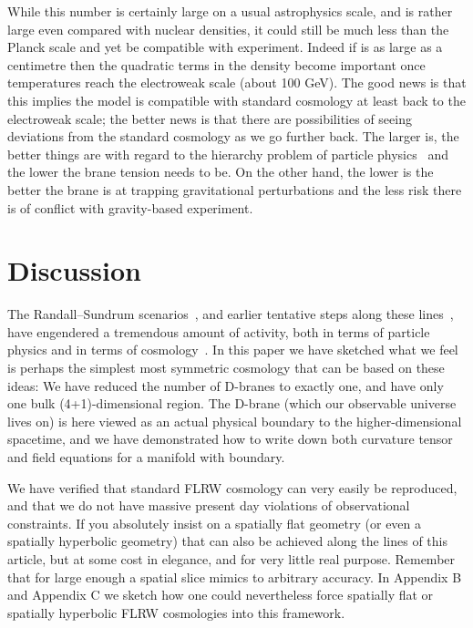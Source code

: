 \documentclass[a4paper,12pt]{article}
\begin{document}
%
While this number is certainly large on a usual astrophysics scale,
and is rather large even compared with nuclear densities, it could
still be much less than the Planck scale and yet be compatible with
experiment. Indeed if \coordHE{} is as large as a centimetre then
the quadratic terms in the density become important once temperatures
reach the electroweak scale (about 100 GeV).  The good news is that
this implies the model is compatible with standard cosmology at least
back to the electroweak scale; the better news is that there are
possibilities of seeing deviations from the standard cosmology as we
go further back. The larger \coordHE{} is, the better things are
with regard to the hierarchy problem of particle physics~\cite{RS1,RS2}
and the lower the brane tension needs to be. On the other hand, the
lower \coordHE{} is the better the brane is at trapping
gravitational perturbations and the less risk there is of conflict
with gravity-based experiment.

\section{Discussion}
\label{S:discusion}

The Randall--Sundrum scenarios~\cite{RS1,RS2}, and earlier tentative
steps along these lines~\cite{Gogberashvili1}, have engendered a
tremendous amount of activity, both in terms of particle physics and
in terms of cosmology~\cite{Gogberashvili2,RS-cosmology}. In this
paper we have sketched what we feel is perhaps the simplest most
symmetric cosmology that can be based on these ideas: We have reduced
the number of D-branes to exactly one, and have only one bulk
(4+1)-dimensional region. The D-brane (which our observable universe
lives on) is here viewed as an actual physical boundary to the
higher-dimensional spacetime, and we have demonstrated how to write
down both curvature tensor and field equations for a manifold with
boundary.

We have verified that standard \coordHE{} FLRW cosmology can very easily
be reproduced, and that we do not have massive present day violations
of observational constraints.  If you absolutely insist on a spatially
flat \coordHE{} geometry (or even a spatially hyperbolic \coordHE{} geometry)
that can also be achieved along the lines of this article, but at some
cost in elegance, and for very little real purpose. Remember that for
\coordHE{} large enough a \coordHE{} spatial slice mimics \coordHE{} to
arbitrary accuracy. In Appendix B and Appendix C we sketch how one
could nevertheless force spatially flat or spatially hyperbolic FLRW
cosmologies into this framework.
\end{document}
